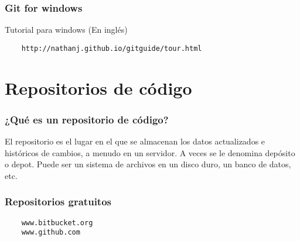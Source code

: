 \documentclass{beamer}
\begin{document}
\begin{frame}[fragile]
  \frametitle{Git for windows}
  Tutorial para windows (En inglés)
  \begin{verbatim}
    http://nathanj.github.io/gitguide/tour.html
  \end{verbatim}
\end{frame}

\section{Repositorios de código}
\begin{frame}
  \frametitle{¿Qué es un repositorio de código?}
  El repositorio es el lugar en el que se almacenan los datos actualizados e históricos de cambios, a menudo en un servidor. A veces se le denomina depósito o depot. Puede ser un sistema de archivos en un disco duro, un banco de datos, etc.
\end{frame}

\begin{frame}[fragile]
  \frametitle{Repositorios gratuitos}
  \begin{verbatim}
    www.bitbucket.org
    www.github.com
  \end{verbatim}
\end{frame}
\end{document}
